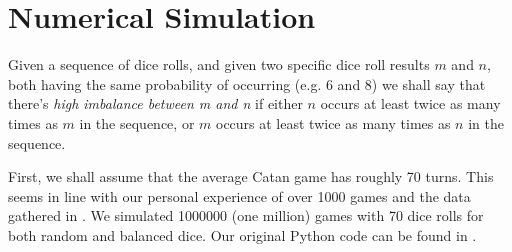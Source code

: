 \documentclass[11pt]{article}
\begin{document}




\section{Numerical Simulation}

Given a sequence of dice rolls, and given two specific dice roll results $m$ and $n$, both having the same probability of occurring (e.g. 6 and 8) we shall say that there's \emph{high imbalance between m and n} if either $n$ occurs at least twice as many times as $m$ in the sequence, or  $m$ occurs at least twice as many times as $n$ in the sequence.

First, we shall assume that the average Catan game has roughly 70 turns. This seems in line with our personal experience of over 1000 games and the data gathered in \cite{BGB}. We simulated 1000000 (one million) games with 70 dice rolls for both random and balanced dice. Our original Python code can be found in \cite{githubsim}.
\end{document}
